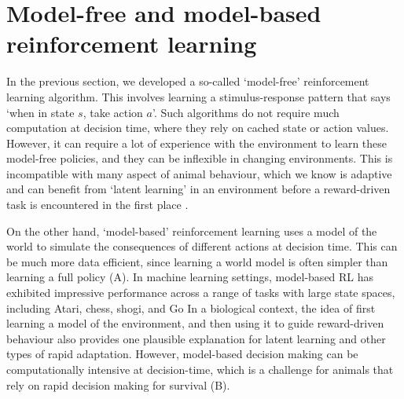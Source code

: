\section{Model-free and model-based reinforcement learning}
\label{sec:model_free_based}

In the previous section, we developed a so-called `model-free' reinforcement learning algorithm.
This involves learning a stimulus-response pattern that says `when in state $s$, take action $a$'.
Such algorithms do not require much computation at decision time, where they rely on cached state or action values.
However, it can require a lot of experience with the environment to learn these model-free policies, and they can be inflexible in changing environments.
This is incompatible with many aspect of animal behaviour, which we know is adaptive and can benefit from `latent learning' in an environment before a reward-driven task is encountered in the first place \citep{blodgett1929effect,tolman1948cognitive}.

On the other hand, `model-based' reinforcement learning uses a model of the world to simulate the consequences of different actions at decision time.
This can be much more data efficient, since learning a world model is often simpler than learning a full policy (A).
In machine learning settings, model-based RL has exhibited impressive performance across a range of tasks with large state spaces, including Atari, chess, shogi, and Go \citep{silver2018general, schrittwieser2020mastering, deisenroth2011pilco}
In a biological context, the idea of first learning a model of the environment, and then using it to guide reward-driven behaviour also provides one plausible explanation for latent learning and other types of rapid adaptation.
However, model-based decision making can be computationally intensive at decision-time, which is a challenge for animals that rely on rapid decision making for survival (B).

